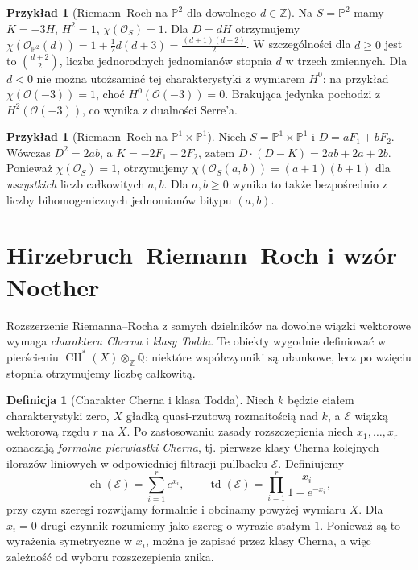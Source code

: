 \documentclass[11pt,a4paper,openany]{report}
\numberwithin{equation}{section}
\theoremstyle{plain}
\theoremstyle{definition}
\newtheorem{definicja}[twierdzenie]{Definicja}
\newtheorem{przyklad}[twierdzenie]{Przykład}
\theoremstyle{remark}
\newcommand{\Z}{\mathbb Z}
\newcommand{\Q}{\mathbb Q}
\newcommand{\PP}{\mathbb P}
\begin{document}
\begin{przyklad}[Riemann--Roch na $\PP^2$ dla dowolnego $d\in\Z$]
\label{prz:ga7-rr-p2}
Na $S=\PP^2$ mamy $K=-3H$, $H^2=1$,
$\chi(\mathcal O_S)=1$. Dla $D=dH$ otrzymujemy
$\chi(\mathcal O_{\PP^2}(d))=1+\frac12d(d+3)
=\frac{(d+1)(d+2)}2$.
W szczególności dla $d\ge0$ jest to
$\binom{d+2}{2}$, liczba jednorodnych jednomianów
stopnia $d$ w trzech zmiennych.
Dla $d<0$ nie można utożsamiać tej charakterystyki
z wymiarem $H^0$: na przykład
$\chi(\mathcal O(-3))=1$, choć $H^0(\mathcal O(-3))=0$.
Brakująca jedynka pochodzi z $H^2(\mathcal O(-3))$,
co wynika z dualności Serre'a.
\end{przyklad}

\begin{przyklad}[Riemann--Roch na $\PP^1\times\PP^1$]
Niech $S=\PP^1\times\PP^1$ i
$D=aF_1+bF_2$. Wówczas $D^2=2ab$, a
$K=-2F_1-2F_2$, zatem
$D\cdot(D-K)=2ab+2a+2b$.
Ponieważ $\chi(\mathcal O_S)=1$,
otrzymujemy
$\chi(\mathcal O_S(a,b))=(a+1)(b+1)$
dla \emph{wszystkich} liczb całkowitych $a,b$.
Dla $a,b\ge0$ wynika to także bezpośrednio z liczby
bihomogenicznych jednomianów bitypu $(a,b)$.
\end{przyklad}

\section{Hirzebruch--Riemann--Roch i wzór Noether}
\label{sec:ga7-noether}

Rozszerzenie Riemanna--Rocha z samych dzielników
na dowolne wiązki wektorowe wymaga \emph{charakteru Cherna}
i \emph{klasy Todda}. Te obiekty wygodnie definiować
w pierścieniu $\operatorname{CH}^*(X)\otimes_\Z\Q$:
niektóre współczynniki są ułamkowe, lecz po wzięciu
stopnia otrzymujemy liczbę całkowitą.

\begin{definicja}[Charakter Cherna i klasa Todda]
\label{def:ga7-ch-td}
Niech $k$ będzie ciałem charakterystyki zero,
$X$ gładką quasi-rzutową rozmaitością nad $k$,
a $\mathcal E$ wiązką wektorową rzędu $r$ na $X$.
Po zastosowaniu zasady rozszczepienia niech
$x_1,\ldots,x_r$ oznaczają \emph{formalne pierwiastki Cherna},
tj. pierwsze klasy Cherna kolejnych ilorazów liniowych
w odpowiedniej filtracji pullbacku $\mathcal E$.
Definiujemy
\[
\operatorname{ch}(\mathcal E)=\sum_{i=1}^r e^{x_i},
\qquad
\operatorname{td}(\mathcal E)=\prod_{i=1}^r
\frac{x_i}{1-e^{-x_i}},
\]
przy czym szeregi rozwijamy formalnie i obcinamy
powyżej wymiaru $X$. Dla $x_i=0$ drugi czynnik
rozumiemy jako szereg o wyrazie stałym $1$.
Ponieważ są to wyrażenia symetryczne w $x_i$,
można je zapisać przez klasy Cherna, a więc
zależność od wyboru rozszczepienia znika.
\end{definicja}
\end{document}
